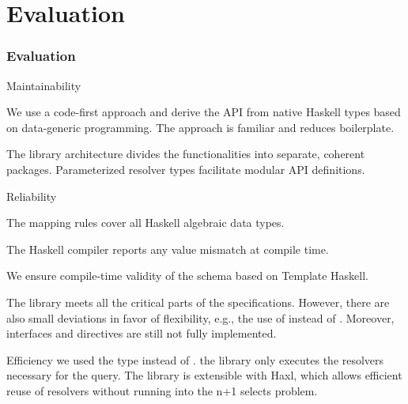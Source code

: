 \section{Evaluation}

\begin{frame}[allowframebreaks]\frametitle{Evaluation}

\begin{block}{Maintainability}

  \begin{itemize}
  
     We use a code-first approach and derive the API from native Haskell types based on data-generic programming. The approach is familiar and reduces boilerplate.

    The library architecture divides the functionalities into separate, coherent packages. Parameterized resolver types facilitate modular API definitions.

  \end{itemize}

\end{block}


\begin{block}{Reliability}

\begin{itemize}

    \begin{enumerate}

       The mapping rules cover all Haskell algebraic data types.

       The Haskell compiler reports any value mismatch at compile time.
      
       We ensure compile-time validity of the schema based on Template Haskell. 
    
    \end{enumerate}

   The library meets all the critical parts of the specifications. However, there are also small deviations in favor of flexibility, e.g., the use of  instead of . Moreover, interfaces and directives are still not fully implemented. 

\end{itemize}

\end{block}

\begin{block}{Efficiency} we used the type  instead of . the library only executes the resolvers necessary for the query. The library is extensible with Haxl, which allows efficient reuse of resolvers without running into the n+1 selects problem.

\end{block}


\end{frame}
